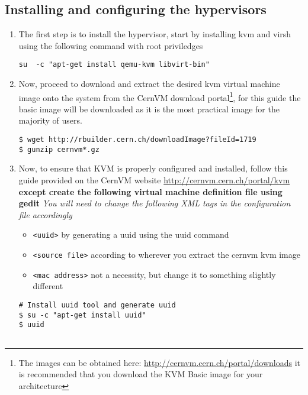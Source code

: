 \subsection{Installing and configuring the hypervisors}
\label{sec:debianhypervisor}
\begin{enumerate}
\item The first step is to install the hypervisor, start by installing kvm and virsh using the following command with root priviledges
\lstset{caption=Installing KVM and Virsh Support}
\begin{lstlisting}
su 	-c "apt-get install qemu-kvm libvirt-bin"
\end{lstlisting}

\item Now, proceed to download and extract the desired kvm virtual machine image onto the system from the CernVM download portal\footnote{The images can be obtained here: \url{http://cernvm.cern.ch/portal/downloads} it is recommended that you download the KVM Basic image for your architecture}, for this guide the
basic image will be downloaded as it is the most practical image for the majority of users.

\lstset{caption=Download and Extract CernVM KVM Basic Image}
\begin{lstlisting}
$ wget http://rbuilder.cern.ch/downloadImage?fileId=1719
$ gunzip cernvm*.gz
\end{lstlisting}

\item Now, to ensure that KVM is properly configured and installed, follow this guide provided on the CernVM website
\url{http://cernvm.cern.ch/portal/kvm} {\bf except create the following virtual machine definition file using gedit}
\emph{You will need to change the following XML tags in the configuration file accordingly}
\begin{itemize}
\item \verb|<uuid>| by generating a uuid using the uuid command
\item \verb|<source file>| according to wherever you extract the cernvm kvm image
\item \verb|<mac address>| not a necessity, but change it to something slightly different
\end{itemize}

\lstset{caption=Create CernVM KVM Definition File}
\begin{lstlisting}
# Install uuid tool and generate uuid
$ su -c "apt-get install uuid"
$ uuid


\end{lstlisting}
\end{enumerate}
